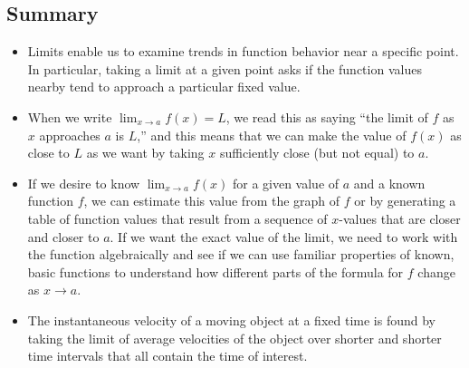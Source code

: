\documentclass[10pt,]{book}
\theoremstyle{plain}
\theoremstyle{definition}
\theoremstyle{definition}
\theoremstyle{definition}
\theoremstyle{definition}
\theoremstyle{definition}
\numberwithin{equation}{section}
\begin{document}
\subsection[{Summary}]{Summary}\label{subsection-8}
\leavevmode%
\begin{itemize}[label=\textbullet]
\item{}Limits enable us to examine trends in function behavior near a specific point. In particular, taking a limit at a given point asks if the function values nearby tend to approach a particular fixed value.%
\item{}When we write \(\lim_{x \to a} f(x) = L\), we read this as saying ``the limit of \(f\) as \(x\) approaches \(a\) is \(L\),'' and this means that we can make the value of \(f(x)\) as close to \(L\) as we want by taking \(x\) sufficiently close (but not equal) to \(a\).%
\item{} If we desire to know \(\lim_{x \to a} f(x)\) for a given value of \(a\) and a known function \(f\), we can estimate this value from the graph of \(f\) or by generating a table of function values that result from a sequence of \(x\)-values that are closer and closer to \(a\). If we want the exact value of the limit, we need to work with the function algebraically and see if we can use familiar properties of known, basic functions to understand how different parts of the formula for \(f\) change as \(x \to a\).%
\item{}The instantaneous velocity of a moving object at a fixed time is found by taking the limit of average velocities of the object over shorter and shorter time intervals that all contain the time of interest.%
\end{itemize}
\typeout{************************************************}
\typeout{************************************************}
\end{document}
